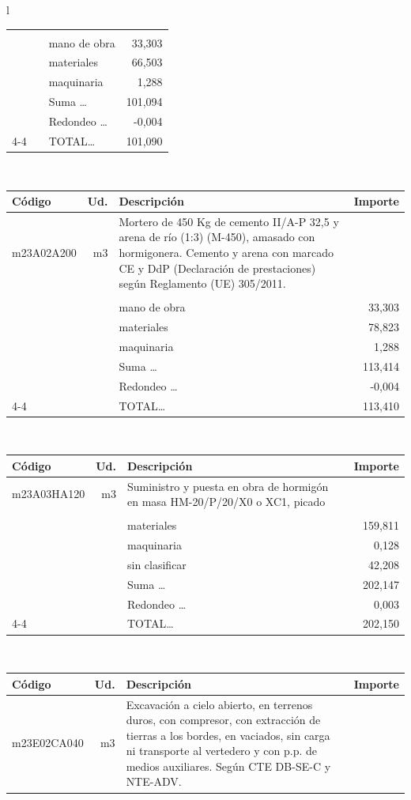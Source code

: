 \documentclass{book}%
\begin{document}
\begin{longtable}{l}
\begin{tabular}{l r p{60mm} r}
&&&\\%
&&mano de obra&    33,303\\%
&&materiales&    66,503\\%
&&maquinaria&     1,288\\%
&&Suma \ldots&   101,094\\%
&&Redondeo \ldots&    {-}0,004\\%
\cline{4-4}%
&&TOTAL\ldots&   101,090\\%
\end{tabular}\\%
\begin{tabular}{l r p{60mm} r}%
Código&Ud.&Descripción&Importe\\%
\hline%
m23A02A200&m3&Mortero de 450 Kg de cemento II/A{-}P 32,5 y arena de río (1:3) (M{-}450), amasado con hormigonera. Cemento y arena con marcado CE y DdP (Declaración de prestaciones) según Reglamento (UE) 305/2011.&\\%
&&&\\%
&&mano de obra&    33,303\\%
&&materiales&    78,823\\%
&&maquinaria&     1,288\\%
&&Suma \ldots&   113,414\\%
&&Redondeo \ldots&    {-}0,004\\%
\cline{4-4}%
&&TOTAL\ldots&   113,410\\%
\end{tabular}\\%
\begin{tabular}{l r p{60mm} r}%
Código&Ud.&Descripción&Importe\\%
\hline%
m23A03HA120&m3&Suministro y puesta en obra de hormigón en masa HM{-}20/P/20/X0 o XC1, picado&\\%
&&&\\%
&&materiales&   159,811\\%
&&maquinaria&     0,128\\%
&&sin clasificar&    42,208\\%
&&Suma \ldots&   202,147\\%
&&Redondeo \ldots&     0,003\\%
\cline{4-4}%
&&TOTAL\ldots&   202,150\\%
\end{tabular}\\%
\begin{tabular}{l r p{60mm} r}%
Código&Ud.&Descripción&Importe\\%
\hline%
m23E02CA040&m3&Excavación a cielo abierto, en terrenos duros, con compresor, con extracción de tierras a los bordes, en vaciados, sin carga ni transporte al vertedero y con p.p. de medios auxiliares. Según CTE DB{-}SE{-}C y NTE{-}ADV.&\\%

\end{tabular}
\end{longtable}
\end{document}
